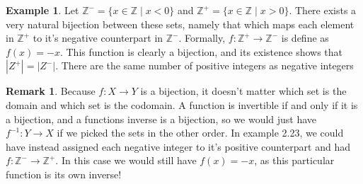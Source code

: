 \documentclass{article}
\newcommand{\Z}{\mathbb{Z}}
\theoremstyle{definition}
\newtheorem{example}{Example}[section]
\newtheorem{remark}{Remark}[section]
\begin{document}
\begin{example}
	Let $ \Z^-=\{x\in\Z\mid x<0\} $ and $ \Z^+=\{x\in\Z\mid x>0\} $. There exists a very natural bijection between these sets, namely that which maps each element in $ \Z^+ $ to it's negative counterpart in $ \Z^- $. Formally, $ f:\Z^+\to\Z^- $ is define as $ f(x)=-x $. This function is clearly a bijection, and its existence shows that $ |Z^+|=|Z^-| $. There are the same number of positive integers as negative integers  
\end{example}
\begin{remark}
	Because $ f:X\to Y $ is a bijection, it doesn't matter which set is the domain and which set is the codomain. A function is invertible if and only if it is a bijection, and a functions inverse is a bijection, so we would just have $ f^{-1}:Y\to X $ if we picked the sets in the other order. In example 2.23, we could have instead assigned each negative integer to it's positive counterpart and had $ f:\Z^-\to\Z^+ $. In this case we would still have $ f(x)=-x $, as this particular function is its own inverse! 
\end{remark}
\end{document}
